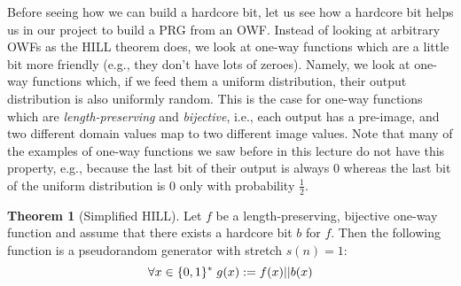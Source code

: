 \documentclass[a4paper,table,dvipsnames]{article}
\theoremstyle{definition}
\newtheorem*{theorem}{Theorem}
\begin{document}
Before seeing how we can build a hardcore bit, let us see how a hardcore bit helps us in our project to build a PRG from an OWF.
Instead of looking at arbitrary OWFs as the HILL theorem does, we look at one-way functions which are a little bit more friendly
(e.g., they don't have lots of zeroes). Namely, we look at one-way functions which, if we feed them a uniform distribution, their
output distribution is also uniformly random. This is the case for one-way functions which are \emph{length-preserving} and
\emph{bijective}, i.e., each output has a pre-image, and two different domain values map to two different image values.
Note that many of the examples of one-way functions we saw before in this lecture do not have this property, e.g., because the last bit of their output is always $0$ whereas the last bit of the uniform distribution is $0$ only with probability $\tfrac{1}{2}$.
\begin{theorem}[Simplified HILL]\label{thm:weakHill}
Let $f$ be a length-preserving, bijective one-way function and assume that there exists a hardcore bit $b$ for $f$. Then the following function is a pseudorandom generator with stretch $s(n)=1$:
\[\forall x\in\{0,1\}^*\;g(x):=f(x)||b(x)\]
\end{theorem}
\end{document}
